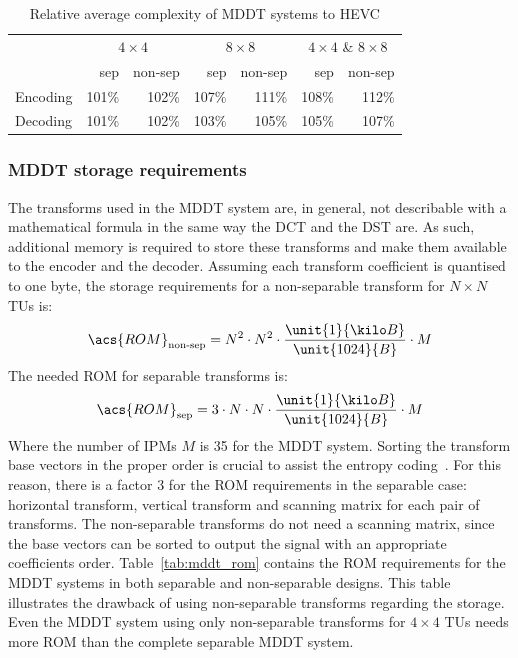 \documentclass[11pt,a4paper,openright,twoside]{book}
\numberwithin{equation}{section} %
\numberwithin{figure}{section} %
\numberwithin{table}{section} %
\begin{document}
\begin{table}[tb]
	\centering
	\small
	\begin{tabular}{l|rr|rr|rr}
		& \multicolumn{2}{c|}{$4\times4$}
		& \multicolumn{2}{c|}{$8\times8$}
		& \multicolumn{2}{c}{$4\times4$ \& $8\times8$} \\
		& sep & non-sep & sep & non-sep & sep & non-sep \\
		\hline\hline
		Encoding & 101\% & 102\% & 107\% & 111\% & 108\% & 112\% \\
		Decoding & 101\% & 102\% & 103\% & 105\% & 105\% & 107\% \\
	\end{tabular}
	\caption{Relative average complexity of \acs{MDDT} systems to \acs{HEVC}}
	\label{tab:mddt_complexity}
\end{table}

\subsubsection{\acs{MDDT} storage requirements}
\label{ssub:mddt_storage_requirements}

The transforms used in the \ac{MDDT} system are, in general, not describable
with a mathematical formula in the same way the \ac{DCT} and the \ac{DST} are.
As such, additional memory is required to store these transforms and make them
available to the encoder and the decoder.
Assuming each transform coefficient is quantised to one byte, the storage
requirements for a non-separable transform for $N\times N$ \acp{TU} is:
\begin{equation}
	\acs{ROM}_{\text{non-sep}} =
	N^2 \cdot N^2 \cdot \frac{\unit{1}{\kilo B}}{\unit{1024}{B}} \cdot M
	\label{eqn:rom_nsep}
\end{equation}
The needed \acs{ROM} for separable transforms is:
\begin{equation}
	\acs{ROM}_{\text{sep}} =
	3 \cdot N \cdot N \cdot \frac{\unit{1}{\kilo B}}{\unit{1024}{B}} \cdot M
	\label{eqn:rom_sep}
\end{equation}
Where the number of \acp{IPM} $M$ is 35 for the \ac{MDDT} system.
Sorting the transform base vectors in the proper order is crucial to assist
the entropy coding~\cite{ye-08-intra-directional-scanning-mddt}.
For this reason, there is a factor 3 for the \acs{ROM} requirements in the
separable case: horizontal transform, vertical transform and scanning matrix
for each pair of transforms.
The non-separable transforms do not need a scanning matrix, since the base
vectors can be sorted to output the signal with an appropriate coefficients
order.
Table~\ref{tab:mddt_rom} contains the \acs{ROM} requirements for the \ac{MDDT}
systems in both separable and non-separable designs.
This table illustrates the drawback of using non-separable transforms
regarding the storage.
Even the \ac{MDDT} system using only non-separable transforms for $4\times4$
\acp{TU} needs more \acs{ROM} than the complete separable \ac{MDDT} system.
\end{document}
